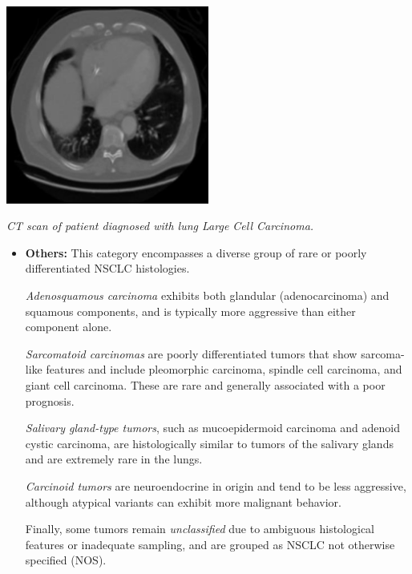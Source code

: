 \vspace{1em}
\begin{center}
    \includegraphics[width=0.5\textwidth]{../assets/01-overview/lc-lcc-ct.jpg}

    \small\textit{CT scan of patient diagnosed with lung Large Cell Carcinoma. 
    \cite{SHATNAWI2025100188}}
\end{center}
\vspace{1em}

\begin{itemize}
    \item \textbf{Others:} This category encompasses a diverse group of rare or poorly 
    differentiated NSCLC histologies.
    
    \textit{Adenosquamous carcinoma} exhibits both glandular (adenocarcinoma) and squamous 
    components, and is typically more aggressive than either component alone.
    
    \textit{Sarcomatoid carcinomas} are poorly differentiated tumors that show sarcoma-like features 
    and include pleomorphic carcinoma, spindle cell carcinoma, and giant cell carcinoma. These are 
    rare and generally associated with a poor prognosis.
    
    \textit{Salivary gland-type tumors}, such as mucoepidermoid carcinoma and adenoid cystic 
    carcinoma, are histologically similar to tumors of the salivary glands and are extremely rare in 
    the lungs.
    
    \textit{Carcinoid tumors} are neuroendocrine in origin and tend to be less aggressive, although 
    atypical variants can exhibit more malignant behavior.
    
    Finally, some tumors remain \textit{unclassified} due to ambiguous histological features or 
    inadequate sampling, and are grouped as NSCLC not otherwise specified (NOS). \cite{travis2015}
\end{itemize}

